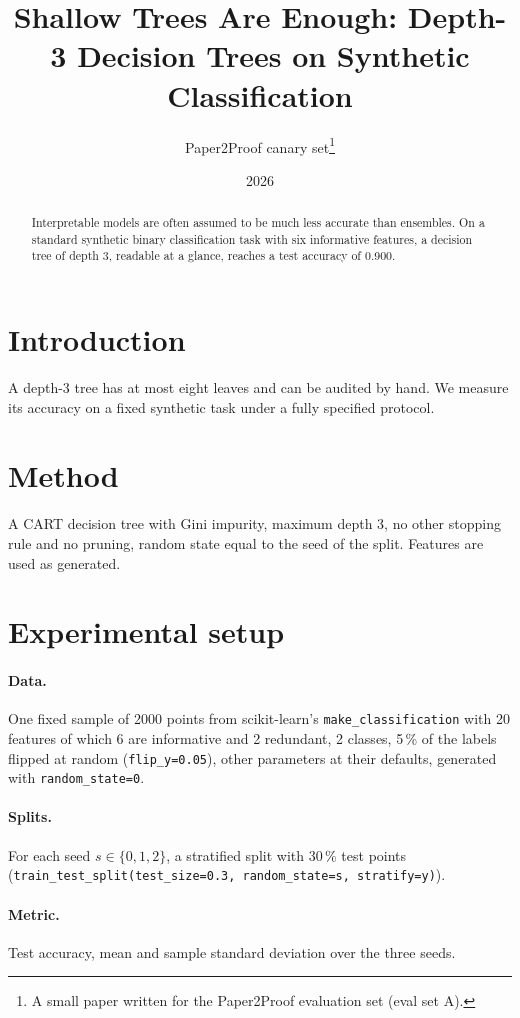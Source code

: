 \documentclass[11pt]{article}
\title{Shallow Trees Are Enough: Depth-3 Decision Trees on Synthetic Classification}
\author{Paper2Proof canary set\thanks{A small paper written for the Paper2Proof evaluation set (eval set A).}}
\date{2026}
\begin{document}
\maketitle

\begin{abstract}
Interpretable models are often assumed to be much less accurate than ensembles. On a standard
synthetic binary classification task with six informative features, a decision tree of depth 3,
readable at a glance, reaches a test accuracy of 0.900.
\end{abstract}

\section{Introduction}
A depth-3 tree has at most eight leaves and can be audited by hand. We measure its accuracy on a
fixed synthetic task under a fully specified protocol.

\section{Method}
A CART decision tree with Gini impurity, maximum depth 3, no other stopping rule and no pruning,
random state equal to the seed of the split. Features are used as generated.

\section{Experimental setup}
\paragraph{Data.} One fixed sample of 2000 points from scikit-learn's
\texttt{make\_classification} with 20 features of which 6 are informative and 2 redundant,
2 classes, 5\,\% of the labels flipped at random (\texttt{flip\_y=0.05}), other parameters at
their defaults, generated with \texttt{random\_state=0}.
\paragraph{Splits.} For each seed $s \in \{0, 1, 2\}$, a stratified split with 30\,\% test
points (\texttt{train\_test\_split(test\_size=0.3, random\_state=s, stratify=y)}).
\paragraph{Metric.} Test accuracy, mean and sample standard deviation over the three seeds.
\end{document}

